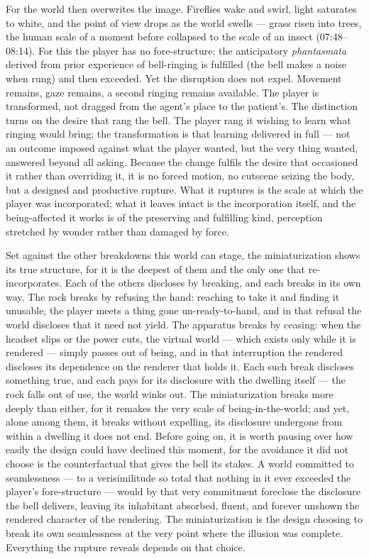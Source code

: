 \documentclass{article}
\begin{document}
For the world then overwrites the image. Fireflies wake and swirl, light saturates to white, and the point of view drops as the world swells — grass risen into trees, the human scale of a moment before collapsed to the scale of an insect (07:48--08:14). For this the player has no fore-structure; the anticipatory \textit{phantasmata} derived from prior experience of bell-ringing is fulfilled (the bell makes a noise when rung) and then exceeded. Yet the disruption does not expel. Movement remains, gaze remains, a second ringing remains available. The player is transformed, not dragged from the agent's place to the patient's. The distinction turns on the desire that rang the bell. The player rang it wishing to learn what ringing would bring; the transformation is that learning delivered in full — not an outcome imposed against what the player wanted, but the very thing wanted, answered beyond all asking. Because the change fulfils the desire that occasioned it rather than overriding it, it is no forced motion, no cutscene seizing the body, but a designed and productive rupture. What it ruptures is the scale at which the player was incorporated; what it leaves intact is the incorporation itself, and the being-affected it works is of the preserving and fulfilling kind, perception stretched by wonder rather than damaged by force.

Set against the other breakdowns this world can stage, the miniaturization shows its true structure, for it is the deepest of them and the only one that re-incorporates. Each of the others discloses by breaking, and each breaks in its own way. The rock breaks by refusing the hand: reaching to take it and finding it unusable, the player meets a thing gone un-ready-to-hand, and in that refusal the world discloses that it need not yield. The apparatus breaks by ceasing: when the headset slips or the power cuts, the virtual world — which exists only while it is rendered — simply passes out of being, and in that interruption the rendered discloses its dependence on the renderer that holds it. Each such break discloses something true, and each pays for its disclosure with the dwelling itself — the rock falls out of use, the world winks out. The miniaturization breaks more deeply than either, for it remakes the very scale of being-in-the-world; and yet, alone among them, it breaks without expelling, its disclosure undergone from within a dwelling it does not end. Before going on, it is worth pausing over how easily the design could have declined this moment, for the avoidance it did not choose is the counterfactual that gives the bell its stakes. A world committed to seamlessness — to a verisimilitude so total that nothing in it ever exceeded the player's fore-structure — would by that very commitment foreclose the disclosure the bell delivers, leaving its inhabitant absorbed, fluent, and forever unshown the rendered character of the rendering. The miniaturization is the design choosing to break its own seamlessness at the very point where the illusion was complete. Everything the rupture reveals depends on that choice.
\end{document}
